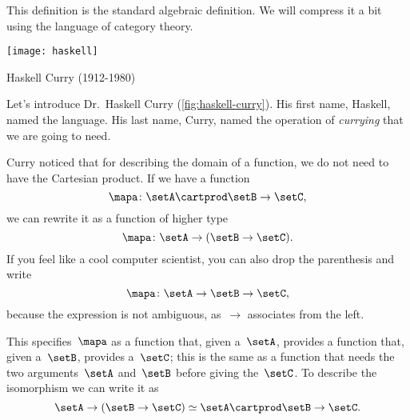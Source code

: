 This definition is the standard algebraic definition.
We will compress it a bit using the language of category theory.

\begin{marginfigure}
    \texttt{[image: haskell]}
    \caption{Haskell Curry (1912-1980)}
    \label{fig:haskell-curry}
\end{marginfigure}

Let's introduce Dr.~Haskell Curry (\cref{fig:haskell-curry}).
His first name, Haskell, named the language.
His last name, Curry, named the operation of \emph{currying} that we are going to need.

Curry noticed that for describing the domain of a function, we do not need to have the Cartesian product.
If we have a function
%
\begin{equation}
    \label{eq:currying-1}
    \mapa \colon \setA \cartprod \setB \to \setC,
\end{equation}
%
we can rewrite it as a function of higher type
%
\begin{equation}
    \label{eq:currying-2}
    \mapa \colon \setA \to ( \setB \to \setC).
\end{equation}
%
If you feel like a cool computer scientist, you can also drop the parenthesis and write
%
\begin{equation}
    \label{eq:currying-3}
    \mapa \colon \setA \to \setB \to \setC,
\end{equation}
%
because the expression is not ambiguous, as~$\to$ associates from the left.


This specifies~$\mapa$ as a function that, given a~$\setA$, provides a function that, given a~$\setB$, provides a~$\setC$;
this is the same as a function that needs the two arguments~$\setA$ and~$\setB$ before giving the~$\setC$.
To describe the isomorphism we can write it as
\begin{equation}
    \label{eq:currying-iso-1}
    \setA \to ( \setB \to \setC) \simeq  \setA \cartprod \setB \to \setC.
\end{equation}


